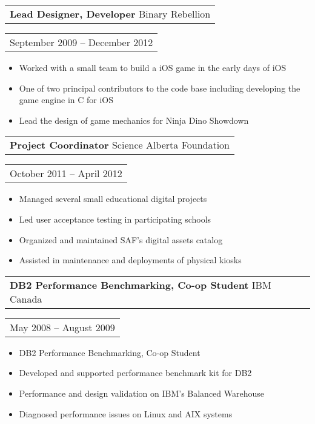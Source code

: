 \documentclass{resume}
\begin{document}
\begin{resume}
    \begin{tabular}[t]{@{}l}
        {\bf Lead Designer, Developer} Binary Rebellion
    \end{tabular}\vspace{+0.05in}
    \hfill
    \begin{tabular}[t]{l@{}}
        September 2009 -- December 2012
    \end{tabular}
    \begin{itemize} \itemsep -2pt
    \item Worked with a small team to build a iOS game in the early days of iOS
    \item One of two principal contributors to the code base including developing the game engine in C for iOS
    \item Lead the design of game mechanics for Ninja Dino Showdown
    \end{itemize}

    \begin{tabular}[t]{@{}l}
        {\bf Project Coordinator} Science Alberta Foundation
    \end{tabular}\vspace{+0.05in}
    \hfill
    \begin{tabular}[t]{l@{}}
        October 2011 -- April 2012
    \end{tabular}
    \begin{itemize} \itemsep -2pt
    \item Managed several small educational digital projects
    \item Led user acceptance testing in participating schools
    \item Organized and maintained SAF’s digital assets catalog
    \item Assisted in maintenance and deployments of physical kiosks
    \end{itemize}

    \begin{tabular}[t]{@{}l}
        {\bf DB2 Performance Benchmarking, Co-op Student} IBM Canada
    \end{tabular}\vspace{+0.05in}
    \hfill
    \begin{tabular}[t]{l@{}}
        May 2008 -- August 2009
    \end{tabular}
	\begin{itemize} \itemsep -2pt
    \item DB2 Performance Benchmarking, Co-op Student
    \item Developed and supported performance benchmark kit for DB2
    \item Performance and design validation on IBM’s Balanced Warehouse
    \item Diagnosed performance issues on Linux and AIX systems
    \end{itemize}


\end{resume}
\end{document}
